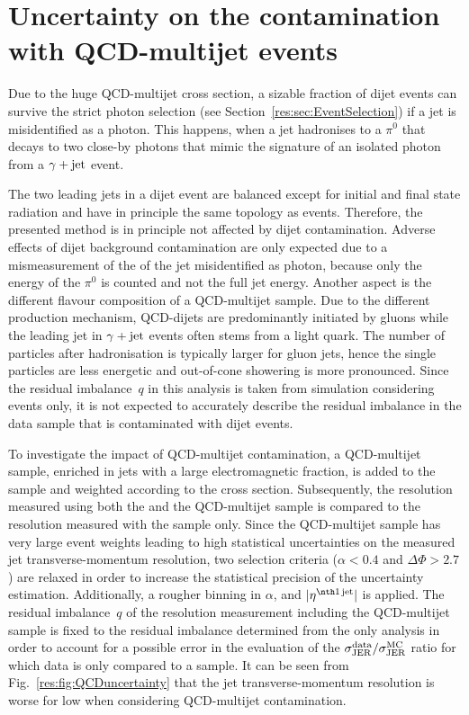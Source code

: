 \section*{Uncertainty on the contamination with QCD-multijet events}
Due to the huge QCD-multijet cross section, a sizable fraction of dijet events can survive the strict photon selection (see Section~\ref{res:sec:EventSelection}) if a jet is misidentified as a photon.
This happens, when \eg a jet hadronises to a $\pi^0$ that decays to two close-by photons that mimic the signature of an isolated photon from a $\gamma + \text{jet}$ event.

The two leading jets in a dijet event are balanced except for initial and final state radiation and have in principle the same topology as \GAMJET events.
Therefore, the presented method is in principle not affected by dijet contamination.
Adverse effects of dijet background contamination are only expected due to a mismeasurement of the \pt of the jet misidentified as photon, because only the energy of the $\pi^0$ is counted and not the full jet energy.
Another aspect is the different flavour composition of a QCD-multijet sample. 
Due to the different production mechanism, QCD-dijets are predominantly initiated by gluons while the leading jet in $\gamma + \text{jet}$ events often stems from a light quark.
The number of particles after hadronisation is typically larger for gluon jets, hence the single particles are less energetic and out-of-cone showering is more pronounced.
Since the residual imbalance~$q$ in this analysis is taken from simulation considering \GAMJET events only, it is not expected to accurately describe the residual imbalance in the data sample that is contaminated with dijet events.

To investigate the impact of QCD-multijet contamination, a QCD-multijet sample, enriched in jets with a large electromagnetic fraction, is added to the \GAMJET sample and weighted according to the cross section.
Subsequently, the resolution measured using both the \GAMJET and the QCD-multijet sample is compared to the resolution measured with the \GAMJET sample only.
Since the QCD-multijet sample has very large event weights leading to high statistical uncertainties on the measured jet transverse-momentum resolution, two selection criteria ($\alpha<0.4$ and $\Delta\Phi>2.7$) are relaxed in order to increase the statistical precision of the uncertainty estimation.
Additionally, a rougher binning in $\alpha$, \ptgamma and $|\etafirstjet|$ is applied.
The residual imbalance~$q$ of the resolution measurement including the QCD-multijet sample is fixed to the residual imbalance determined from the \GAMJET only analysis in order to account for a possible error in the evaluation of the $\sigma_\mathrm{JER}^{\text{data}}/\sigma_\mathrm{JER}^{\text{MC}}$ ratio for which data is only compared to a \GAMJET sample.
It can be seen from Fig.~\ref{res:fig:QCDuncertainty} that the jet transverse-momentum resolution is worse for low \ptgamma when considering QCD-multijet contamination.

